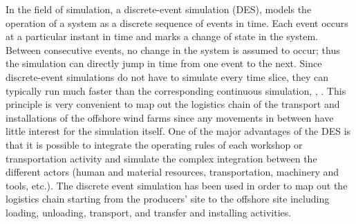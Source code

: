 In the field of simulation, a discrete-event simulation (DES), models the operation of a system as a discrete sequence of events in time. Each event occurs at a particular instant in time and marks a change of state in the system. Between consecutive events, no change in the system is assumed to occur; thus the simulation can directly jump in time from one event to the next. Since discrete-event simulations do not have to simulate every time slice, they can typically run much faster than the corresponding continuous simulation, \cite{Myron1987}, \cite {William1988}.
This principle is very convenient to map out the logistics chain of the transport and installations of the offshore wind farms since any movements in between have little interest for the simulation itself. One of the major advantages of the DES is that it is possible to integrate the operating rules of each workshop or transportation activity and simulate the complex integration between the different actors (human and material resources, transportation, machinery and tools, etc.).  
The discrete event simulation has been used in order to map out the logistics chain starting from the producers’ site to the offshore site including loading, unloading, transport, and transfer and installing activities.
